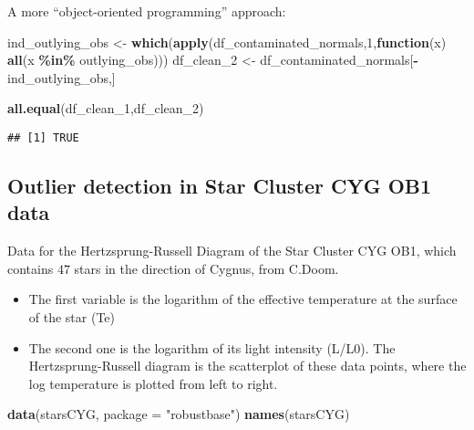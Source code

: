 \documentclass[
]{article}
\newenvironment{Shaded}{\begin{snugshade}}{\end{snugshade}}
\newcommand{\AttributeTok}[1]{\textcolor[rgb]{0.13,0.29,0.53}{#1}}
\newcommand{\ControlFlowTok}[1]{\textcolor[rgb]{0.13,0.29,0.53}{\textbf{#1}}}
\newcommand{\DecValTok}[1]{\textcolor[rgb]{0.00,0.00,0.81}{#1}}
\newcommand{\FunctionTok}[1]{\textcolor[rgb]{0.13,0.29,0.53}{\textbf{#1}}}
\newcommand{\NormalTok}[1]{#1}
\newcommand{\OtherTok}[1]{\textcolor[rgb]{0.56,0.35,0.01}{#1}}
\newcommand{\SpecialCharTok}[1]{\textcolor[rgb]{0.81,0.36,0.00}{\textbf{#1}}}
\newcommand{\StringTok}[1]{\textcolor[rgb]{0.31,0.60,0.02}{#1}}
\providecommand{\tightlist}{%
  \setlength{\itemsep}{0pt}\setlength{\parskip}{0pt}}
\begin{document}
A more ``object-oriented programming'' approach:

\begin{Shaded}
\begin{Highlighting}[]
\NormalTok{ind\_outlying\_obs }\OtherTok{\textless{}{-}} \FunctionTok{which}\NormalTok{(}\FunctionTok{apply}\NormalTok{(df\_contaminated\_normals,}\DecValTok{1}\NormalTok{,}\ControlFlowTok{function}\NormalTok{(x) }\FunctionTok{all}\NormalTok{(x }\SpecialCharTok{\%in\%}\NormalTok{ outlying\_obs)))}
\NormalTok{df\_clean\_2 }\OtherTok{\textless{}{-}}\NormalTok{ df\_contaminated\_normals[}\SpecialCharTok{{-}}\NormalTok{ind\_outlying\_obs,]}
\end{Highlighting}
\end{Shaded}

\begin{Shaded}
\begin{Highlighting}[]
\FunctionTok{all.equal}\NormalTok{(df\_clean\_1,df\_clean\_2)}
\end{Highlighting}
\end{Shaded}

\begin{verbatim}
## [1] TRUE
\end{verbatim}

\hypertarget{outlier-detection-in-star-cluster-cyg-ob1-data}{%
\subsection{Outlier detection in Star Cluster CYG OB1
data}\label{outlier-detection-in-star-cluster-cyg-ob1-data}}

Data for the Hertzsprung-Russell Diagram of the Star Cluster CYG OB1,
which contains \(47\) stars in the direction of Cygnus, from C.Doom.

\begin{itemize}
\tightlist
\item
  The first variable is the logarithm of the effective temperature at
  the surface of the star (Te)
\item
  The second one is the logarithm of its light intensity (L/L0). The
  Hertzsprung-Russell diagram is the scatterplot of these data points,
  where the log temperature is plotted from left to right.
\end{itemize}

\begin{Shaded}
\begin{Highlighting}[]
\FunctionTok{data}\NormalTok{(starsCYG, }\AttributeTok{package =} \StringTok{"robustbase"}\NormalTok{)}
\FunctionTok{names}\NormalTok{(starsCYG)}
\end{Highlighting}
\end{Shaded}
\end{document}
